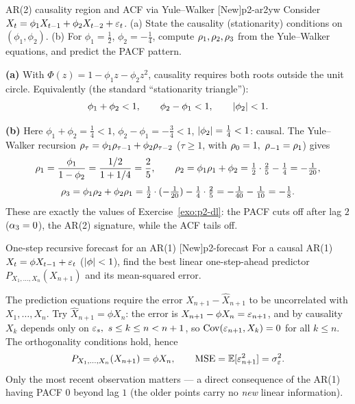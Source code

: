 \begin{exercise}{AR(2) causality region and ACF via Yule--Walker \quad\textnormal{[New]}}{p2-ar2yw}
Consider $X_t=\phi_1 X_{t-1}+\phi_2 X_{t-2}+\varepsilon_t$. (a) State the causality
(stationarity) conditions on $(\phi_1,\phi_2)$. (b) For $\phi_1=\tfrac12$,
$\phi_2=-\tfrac14$, compute $\rho_1,\rho_2,\rho_3$ from the Yule--Walker
equations, and predict the PACF pattern.
\end{exercise}
\begin{solution}
\textbf{(a)} With $\Phi(z)=1-\phi_1 z-\phi_2 z^2$, causality requires both roots
outside the unit circle. Equivalently (the standard ``stationarity triangle''):
\[
\phi_1+\phi_2<1,\qquad \phi_2-\phi_1<1,\qquad \left\lvert \phi_2 \right\rvert<1 .
\]

\textbf{(b)} Here $\phi_1+\phi_2=\tfrac14<1$, $\phi_2-\phi_1=-\tfrac34<1$,
$\left\lvert \phi_2 \right\rvert=\tfrac14<1$: causal. The Yule--Walker recursion
$\rho_\tau=\phi_1\rho_{\tau-1}+\phi_2\rho_{\tau-2}$ ($\tau\ge1$, with
$\rho_0=1,\ \rho_{-1}=\rho_1$) gives
\[
\rho_1=\frac{\phi_1}{1-\phi_2}=\frac{1/2}{1+1/4}=\frac25,
\qquad
\rho_2=\phi_1\rho_1+\phi_2=\tfrac12\cdot\tfrac25-\tfrac14=-\tfrac1{20},
\]
\[
\rho_3=\phi_1\rho_2+\phi_2\rho_1
=\tfrac12\cdot(-\tfrac1{20})-\tfrac14\cdot\tfrac25
=-\tfrac1{40}-\tfrac1{10}=-\tfrac18 .
\]
These are exactly the values of Exercise~\ref{exo:p2-dl}: the PACF cuts off after
lag $2$ ($\alpha_3=0$), the AR(2) signature, while the ACF tails off.
\end{solution}

\begin{exercise}{One-step recursive forecast for an AR(1) \quad\textnormal{[New]}}{p2-forecast}
For a causal AR(1) $X_t=\phi X_{t-1}+\varepsilon_t$ ($\left\lvert \phi \right\rvert<1$), find the best linear
one-step-ahead predictor $P_{X_1,\dots,X_n}(X_{n+1})$ and its mean-squared error.
\end{exercise}
\begin{solution}
The prediction equations require the error $X_{n+1}-\hat X_{n+1}$ to be
uncorrelated with $X_1,\dots,X_n$. Try $\hat X_{n+1}=\phi X_n$: the error is
$X_{n+1}-\phi X_n=\varepsilon_{n+1}$, and by causality $X_k$ depends only on
$\varepsilon_s,\ s\le k\le n<n+1$, so $\operatorname{Cov}(\varepsilon_{n+1},X_k)=0$ for all $k\le n$. The
orthogonality conditions hold, hence
\[
P_{X_1,\dots,X_n}(X_{n+1})=\phi X_n,
\qquad
\operatorname{MSE}=\mathbb{E}[\varepsilon_{n+1}^2]=\sigma_\varepsilon^2 .
\]
Only the most recent observation matters --- a direct consequence of the AR(1)
having PACF $0$ beyond lag $1$ (the older points carry no \emph{new} linear
information).
\end{solution}
